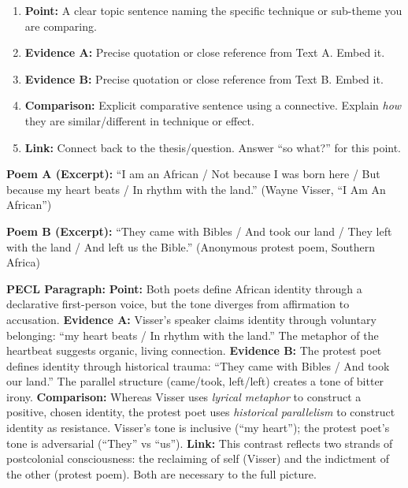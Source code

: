 \documentclass[11pt]{article}
\begin{document}
\begin{methode}
\begin{enumerate}
\item \textbf{Point:} A clear topic sentence naming the specific technique or sub-theme you are comparing.
\item \textbf{Evidence A:} Precise quotation or close reference from Text A. Embed it.
\item \textbf{Evidence B:} Precise quotation or close reference from Text B. Embed it.
\item \textbf{Comparison:} Explicit comparative sentence using a connective. Explain \emph{how} they are similar/different in technique or effect.
\item \textbf{Link:} Connect back to the thesis/question. Answer ``so what?'' for this point.
\end{enumerate}
\end{methode}

\begin{exoresolu}
\textbf{Poem A (Excerpt):} ``I am an African / Not because I was born here / But because my heart beats / In rhythm with the land.'' (Wayne Visser, ``I Am An African'')

\textbf{Poem B (Excerpt):} ``They came with Bibles / And took our land / They left with the land / And left us the Bible.'' (Anonymous protest poem, Southern Africa)

\textbf{PECL Paragraph:}
\textbf{Point:} Both poets define African identity through a declarative first-person voice, but the tone diverges from affirmation to accusation. 
\textbf{Evidence A:} Visser's speaker claims identity through voluntary belonging: ``my heart beats / In rhythm with the land.'' The metaphor of the heartbeat suggests organic, living connection. 
\textbf{Evidence B:} The protest poet defines identity through historical trauma: ``They came with Bibles / And took our land.'' The parallel structure (came/took, left/left) creates a tone of bitter irony. 
\textbf{Comparison:} Whereas Visser uses \emph{lyrical metaphor} to construct a positive, chosen identity, the protest poet uses \emph{historical parallelism} to construct identity as resistance. Visser's tone is inclusive (``my heart''); the protest poet's tone is adversarial (``They'' vs ``us''). 
\textbf{Link:} This contrast reflects two strands of postcolonial consciousness: the reclaiming of self (Visser) and the indictment of the other (protest poem). Both are necessary to the full picture.
\end{exoresolu}
\end{document}
